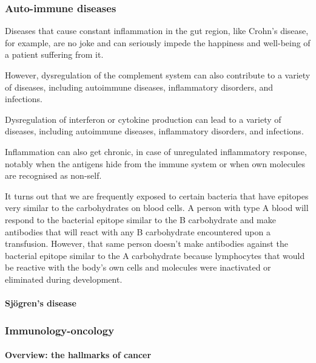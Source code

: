 \subsubsection{Auto-immune diseases}
\label{subsec:auto-immune disease}

Diseases that cause constant
inflammation in the gut region, like Crohn’s disease, for example, are no
joke and can seriously impede the happiness and well-being of a patient
suffering from it.



 However, dysregulation of the complement system can also contribute to a variety of diseases, including autoimmune diseases, inflammatory disorders, and infections.

Dysregulation of interferon or cytokine production can lead to a variety of diseases, including autoimmune diseases, inflammatory disorders, and infections.

 Inflammation can also get chronic, in case of unregulated inflammatory response, notably when the antigens hide from the immune system or when own molecules are recognised as non-self. 

It turns out that we are frequently exposed
to certain bacteria that have epitopes very similar to the carbohydrates
on blood cells. A person with type A blood will
respond to the bacterial epitope similar to the B carbohydrate
and make antibodies that will react with any B carbohydrate
encountered upon a transfusion. However, that same person
doesn’t make antibodies against the bacterial epitope similar
to the A carbohydrate because lymphocytes that would be
reactive with the body’s own cells and molecules were inactivated
or eliminated during development.
\paragraph{Sjögren's disease}

\subsubsection{Immunology-oncology}
\paragraph{Overview: the hallmarks of cancer}
